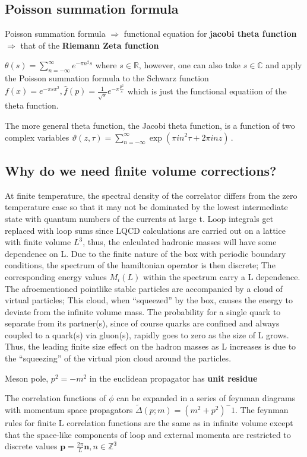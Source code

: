 \documentclass[12pt,tightenlines, raggedbottom, prd, notitlepage]{revtex4-1}
\begin{document}
\subsection*{Poisson summation formula}
Poisson summation formula $\Rightarrow $ functional equation for \textbf{jacobi theta function}
$\Rightarrow$ that of the \textbf{Riemann Zeta function}

$\theta(s) = \sum_{n=-\infty}^{\infty}e^{-\pi n^2s}$ where $s\in\mathbb{R}$, however, one can 
also take $s\in\mathbb{C}$ and apply the Poisson summation formula to the Schwarz function
$f(x) = e^{-\pi sx^2}, \hat{f}(p) = \frac{1}{\sqrt{s}}e^{-\pi \frac{p^2}{s}} $
which is just the functional equatiion of the theta function.

The more general theta function, the Jacobi theta function, is a function of two complex
variables $\vartheta(z,\tau) = \sum_{n = - \infty}^{\infty} \exp(\pi i n^2 \tau + 2\pi i n z) \,. $

\subsection*{Why do we need finite volume corrections?}
At finite temperature, the spectral density of the correlator differs from the zero temperature case
so that it may not be dominated by the lowest intermediate state with quantum numbers of the currents 
at large t. Loop integrals get replaced with loop sums since LQCD calculations are carried out on a lattice
with finite volume $L^3$, thus, the calculated hadronic masses will have some dependence on L.
Due to the finite nature of the box with periodic boundary conditions, the spectrum of the
hamiltonian operator is then discrete; The corresponding energy values $M_i(L)$ within the spectrum
carry a L dependence. The afroementioned pointlike stable particles are accompanied by a cloud of 
virtual particles; This cloud, when ``squeezed'' by the box, causes the energy to deviate from the
infinite volume mass. The probability for a single quark to separate from its partner(s), since of course
quarks are confined and always coupled to a quark(s) via gluon(s), rapidly goes to zero as the size of L
grows. Thus, the leading finite size effect on the hadron masses as L increases is due to the ``squeezing''
of the virtual pion cloud around the particles. 

Meson pole, $p^2 = -m^2$ in the euclidean propagator has \textbf{unit residue} 

The correlation functions of $\phi$ can be expanded in a series of feynman diagrams with momentum
space propagators $\tilde{\Delta}(p;m) = (m^2 + p^2)^-1$. The feynman rules for finite L correlation functions
are the same as in infinite volume except that the space-like components of loop and external momenta
are restricted to discrete values $\textbf{p} = \frac{2\pi}{L}\textbf{n}, n\in \mathbb{Z^3}$
\end{document}
